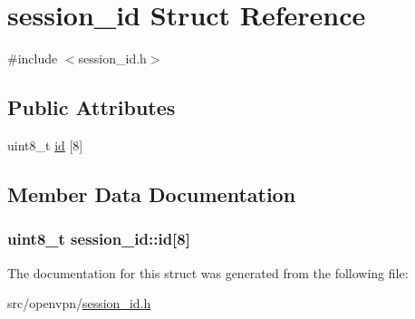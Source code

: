 \hypertarget{structsession__id}{}\section{session\+\_\+id Struct Reference}
\label{structsession__id}


{\ttfamily \#include $<$session\+\_\+id.\+h$>$}

\subsection*{Public Attributes}
\begin{DoxyCompactItemize}
\item 
uint8\+\_\+t \hyperlink{structsession__id_a3a4debb6b8be3e768a09f9edfb6f341a}{id} \mbox{[}8\mbox{]}
\end{DoxyCompactItemize}


\subsection{Member Data Documentation}
\hypertarget{structsession__id_a3a4debb6b8be3e768a09f9edfb6f341a}{}
\subsubsection[{id}]{\setlength{\rightskip}{0pt plus 5cm}uint8\+\_\+t session\+\_\+id\+::id\mbox{[}8\mbox{]}}\label{structsession__id_a3a4debb6b8be3e768a09f9edfb6f341a}


The documentation for this struct was generated from the following file\+:\begin{DoxyCompactItemize}
\item 
src/openvpn/\hyperlink{session__id_8h}{session\+\_\+id.\+h}\end{DoxyCompactItemize}
